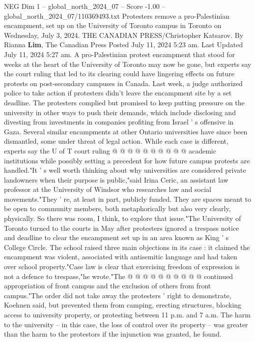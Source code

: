 \begin{textsample}{NEG Dim 1 – global\_north\_2024\_07 – Score -1.00 – global\_north\_2024\_07/110369493.txt}  \label{ex:f1_neg_267}
Protesters remove a pro-Palestinian encampment, set up on the University of Toronto campus in Toronto on Wednesday, July 3, 2024.
THE CANADIAN PRESS/Christopher Katsarov.
By Rianna \textbf{Lim}, The Canadian Press Posted July 11, 2024 5:23 am.
Last Updated July 11, 2024 5:27 am.
A pro-Palestinian protest encampment that stood for weeks at the heart of the University of Toronto may now be gone, but experts say the court ruling that led to its clearing could have lingering effects on future protests on post-secondary campuses in Canada.
Last week, a judge authorized police to take action if protesters didn't leave the encampment site by a set deadline.
The protesters complied but promised to keep putting pressure on the university in other ways to push their demands, which include disclosing and divesting from investments in companies profiting from Israel ' s offensive in Gaza.
Several similar encampments at other Ontario universities have since been dismantled, some under threat of legal action.
While each case is different, experts say the U of T court ruling @ @ @ @ @ @ @ @ @ @ academic institutions while possibly setting a precedent for how future campus protests are handled."It ' s well worth thinking about why universities are considered private landowners when their purpose is public,"said Irina Ceric, an assistant law professor at the University of Windsor who researches law and social movements."They ' re, at least in part, publicly funded.
They are spaces meant to be open to community members, both metaphorically but also very clearly, physically.
So there was room, I think, to explore that issue."The University of Toronto turned to the courts in May after protesters ignored a trespass notice and deadline to clear the encampment set up in an area known as King ' s College Circle.
The school raised three main objections in its case : it claimed the encampment was violent, associated with antisemitic language and had taken over school property."Case law is clear that exercising freedom of expression is not a defence to trespass,"he wrote."The @ @ @ @ @ @ @ @ @ @ continued appropriation of front campus and the exclusion of others from front campus."The order did not take away the protesters ' right to demonstrate, Koehnen said, but prevented them from camping, erecting structures, blocking access to university property, or protesting between 11 p.m. and 7 a.m.
The harm to the university -- in this case, the loss of control over its property -- was greater than the harm to the protestors if the injunction was granted, he found.

\end{textsample}
